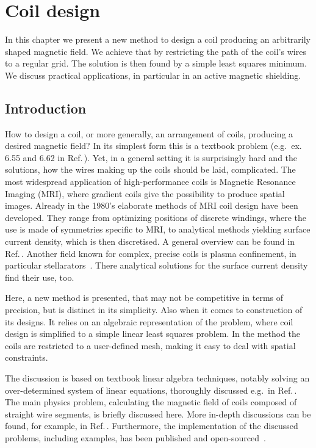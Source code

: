\chapter{Coil design}
\label{ch:coil_design}

In this chapter we present a new method to design a coil producing an arbitrarily shaped magnetic field. We achieve that by restricting the path of the coil's wires to a regular grid. The solution is then found by a simple least squares minimum. We discuss practical applications, in particular in an active magnetic shielding.




\section{Introduction}
How to design a coil, or more generally, an arrangement of coils, producing a desired magnetic field? In its simplest form this is a textbook problem (e.g.\ ex. 6.55 and 6.62 in Ref.\,\cite{Purcell}). Yet, in a general setting it is surprisingly hard and the solutions, how the wires making up the coils should be laid, complicated. The most widespread application of high-performance coils is Magnetic Resonance Imaging (MRI), where gradient coils give the possibility to produce spatial images. Already in the 1980's elaborate methods of MRI coil design have been developed. They range from optimizing positions of discrete windings, where the use is made of symmetries specific to MRI, to analytical methods yielding surface current density, which is then discretised. A general overview can be found in Ref.\,\cite{Turner1993}. Another field known for complex, precise coils is plasma confinement, in particular stellarators~\cite{Beidler1990}. There analytical solutions for the surface current density find their use, too.

Here, a new method is presented, that may not be competitive in terms of precision, but is distinct in its simplicity. Also when it comes to construction of its designs. It relies on an algebraic representation of the problem, where coil design is simplified to a simple linear least squares problem. In the method the coils are restricted to a user-defined mesh, making it easy to deal with spatial constraints.

The discussion is based on textbook linear algebra techniques, notably solving an over-determined system of linear equations, thoroughly discussed e.g.\ in Ref.\,\cite{Anton}. The main physics problem, calculating the magnetic field of coils composed of straight wire segments, is briefly discussed here. More in-depth discussions can be found, for example, in Ref.\,\cite{Griffith}. Furthermore, the implementation of the discussed problems, including examples, has been published and open-sourced~\cite{Coilsjlcode}.

